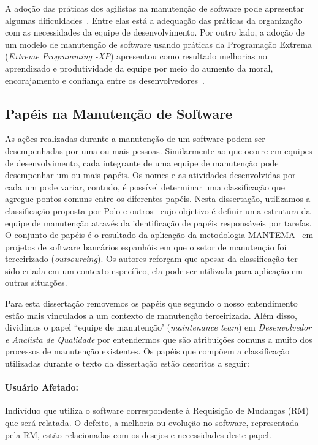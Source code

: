 A adoção das práticas dos agilistas na manutenção de software pode apresentar
algumas dificuldades~\cite{1402140}. Entre elas está a adequação das práticas
da organização com as necessidades da equipe de desenvolvimento. Por outro
lado, a adoção de um modelo de manutenção de software usando práticas da
Programação Extrema (\textit{Extreme Programming \@-\@ XP}) apresentou como
resultado melhorias no aprendizado e produtividade da equipe por meio do
aumento da moral, encorajamento e confiança entre os
desenvolvedores~\cite{Choudhari:2014:EIM:2557833.2557845}.

\subsection{Papéis na Manutenção de Software}\label{subsec:man_visao_geral_papeis_na_manutencao_de_software}

As ações realizadas durante a manutenção de um software podem ser desempenhadas
por uma ou mais pessoas. Similarmente ao que ocorre em equipes de
desenvolvimento, cada integrante de uma equipe de manutenção pode desempenhar
um ou mais papéis. Os nomes e as atividades desenvolvidas por cada um pode
variar, contudo, é possível determinar uma classificação que agregue pontos
comuns entre os diferentes papéis. Nesta dissertação, utilizamos a
classificação proposta por Polo e outros~\cite{Polo1999} cujo objetivo é
definir uma estrutura da equipe de manutenção através da identificação de
papéis responsáveis por tarefas. O conjunto de papéis é o resultado da
aplicação da metodologia MANTEMA~\cite{756695} em projetos de software
bancários espanhóis em que o setor de manutenção foi terceirizado
(\textit{outsourcing}). Os autores reforçam que apesar da classificação ter
sido criada em um contexto específico, ela pode ser utilizada para aplicação em
outras situações.

Para esta dissertação removemos os papéis que segundo o nosso entendimento
estão mais vinculados a um contexto de manutenção terceirizada. Além disso,
dividimos o papel ``equipe de manutenção' (\textit{maintenance team}) em
\textit{Desenvolvedor e Analista de Qualidade} por entendermos que são
atribuições comuns a muito dos processos de manutenção existentes. Os papéis
que compõem a classificação utilizadas durante o texto da dissertação estão
descritos a seguir:

\paragraph{Usuário Afetado:}
Indivíduo que utiliza o software correspondente à Requisição de Mudanças (RM)
que será relatada. O defeito, a melhoria ou evolução no software, representada
pela RM, estão relacionadas com os desejos e necessidades deste papel.

